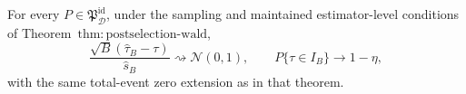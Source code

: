 For every \(P\in\mathfrak P_{\mathcal D}^{\mathrm{id}}\), under the sampling and maintained estimator-level conditions of Theorem~\(\mathrm{thm{:}postselection\text{-}wald}\),
\[
 \frac{\sqrt B(\widehat\tau_B-\tau)}{\widehat s_B}
 \rightsquigarrow\mathcal N(0,1),
 \qquad
 P\{\tau\in I_B\}\longrightarrow1-\eta,
\]
with the same total-event zero extension as in that theorem.
